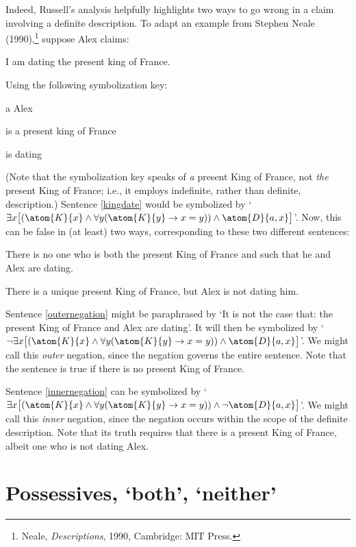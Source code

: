Indeed, Russell's analysis helpfully highlights two ways to go wrong in a claim involving a definite description. To adapt an example from Stephen Neale (1990),\footnote{Neale, \emph{Descriptions}, 1990, Cambridge: MIT Press.} suppose Alex claims:
	\begin{earg}
		\item[\ex{kingdate}] I am dating the present king of France.
	\end{earg}
Using the following symbolization key:
	\begin{ekey}
		\item[a] Alex
		\item[\atom{K}{x}]  is a present king of France
		\item[\atom{D}{x,y}]  is dating 
	\end{ekey}
	(Note that the symbolization key speaks of \emph{a} present King of France, not \emph{the} present King of France; i.e., it employs indefinite, rather than definite, description.) Sentence \ref{kingdate} would be symbolized by `$\exists x \bigl[(\atom{K}{x} \eand \forall y(\atom{K}{y} \eif  x = y)) \eand \atom{D}{a,x}\bigr]$'. Now, this can be false in (at least) two ways, corresponding to these two different sentences:
	\begin{earg}
		\item[\ex{outernegation}] There is no one who is both the present King of France and such that he and Alex are dating.
		\item[\ex{innernegation}] There is a unique present King of France, but Alex is not dating him.
	\end{earg}
Sentence \ref{outernegation} might be paraphrased by `It is not the case that: the present King of France and Alex are dating'. It will then be symbolized by `$\enot \exists x\bigl[(\atom{K}{x} \eand \forall y(\atom{K}{y} \eif  x = y)) \eand \atom{D}{a,x} \bigr]$'. We might call this \emph{outer} negation, since the negation governs the entire sentence. Note that the sentence is true if there is no present King of France.

Sentence \ref{innernegation} can be symbolized by `$\exists x \bigl[(\atom{K}{x} \eand \forall y(\atom{K}{y} \eif x = y)) \eand \enot \atom{D}{a,x}\bigr]$'. We might call this \emph{inner} negation, since the negation occurs within the scope of the definite description. Note that its truth requires that there is a present King of France, albeit one who is not dating Alex.

\section{Possessives, `both', `neither'}

